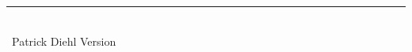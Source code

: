 \documentclass[10pt,landscape]{article}
\def\Year{\expandafter\YEAR\the\year}
\def\YEAR#1#2#3#4{#3#4}
\begin{document}
\begin{multicols}{3}
\rule{0.3\linewidth}{0.25pt}
\scriptsize\\
\Year\ Patrick Diehl \textit{\gitAbbrevHash} Version \gitRels




\end{multicols}
\end{document}
